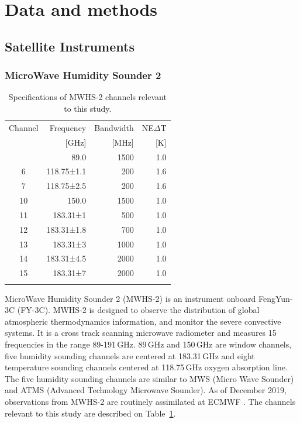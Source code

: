 \documentclass[amt, manuscript]{copernicus}
\begin{document}
\section{Data and methods}
%
\subsection{Satellite Instruments}
%
\subsubsection{ MicroWave Humidity Sounder 2}
%
\begin{table}[t]
	\caption{Specifications of MWHS-2 channels relevant to this study.}
	\label{tab:specifications_MWHS2}	
	\begin{tabular}{crrr}
		\tophline
		Channel & Frequency 	& Bandwidth & NE$\Delta$T \\
		& [GHz]			& [MHz]		& [K]		\\
		\middlehline
		1	&	89.0   		  & 1500			&	1.0	\\
		6	&	118.75±1.1    & \phantom{0}200 	&	1.6\\
		7	&	118.75±2.5    & \phantom{0}200 	&	1.6\\
		10	&	150.0         & 1500 			&	1.0 \\
		11	&	183.31±1      & \phantom{0}500  &	1.0 \\
		12  & 	183.31±1.8    & \phantom{0}700 	&   1.0\\
		13  & 	183.31±3      & 1000    		&	1.0	\\
		14  & 	183.31±4.5    & 2000    		&	1.0\\
		15  & 	183.31±7      & 2000  			&	1.0  \\
		\bottomhline
	\end{tabular}
	\belowtable{} %
\end{table}
MicroWave Humidity Sounder 2 (MWHS-2) is an instrument onboard FengYun-3C (FY-3C). MWHS-2 is designed to observe the distribution of global atmospheric thermodynamics information, and monitor the severe convective systems. It is a cross track scanning microwave radiometer and measures 15 frequencies in the range 89-191\,GHz. 89\,GHz and 150\,GHz are window channels, five humidity sounding channels are centered at 183.31\,GHz and eight temperature sounding channels centered at 118.75\,GHz oxygen absorption line. The five humidity sounding channels are similar to MWS (Micro Wave Sounder) and ATMS (Advanced Technology Microwave Sounder). As of December 2019, observations from MWHS-2 are routinely assimilated at ECMWF \citep{duncan2020MWHS}. The channels relevant to this study are described on Table~\ref{tab:specifications_MWHS2}. 
\end{document}
